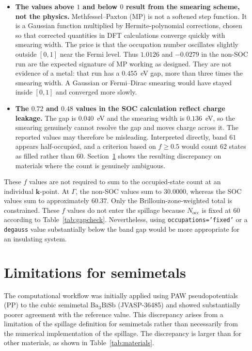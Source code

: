 \documentclass[11pt]{article}
\newcommand{\Nocc}{N_{\mathrm{occ}}}
\newcommand{\kk}{\mathbf{k}}
\newcommand{\bath}{\mathrm{Ba_3BiSb}}
\begin{document}
\begin{itemize}[leftmargin=1.4em,itemsep=2pt]
\item \textbf{The values above $1$ and below $0$ result from the smearing scheme, not the physics.}
Methfessel--Paxton (MP) is not a softened step function. It is a Gaussian function multiplied by
Hermite-polynomial corrections, chosen so that corrected quantities in DFT calculations converge
quickly with smearing width. The price is that the occupation number oscillates slightly outside
$[0,1]$ near the Fermi level. Thus
$1.0126$ and $-0.0279$ in the non-SOC run are the expected signature of MP working as designed. They
are not evidence of a metal: that run has a $0.455$~eV gap, more than three times the smearing width.
A Gaussian or Fermi--Dirac smearing would have stayed inside $[0,1]$ and converged more slowly.
\item \textbf{The $0.72$ and $0.48$ values in the SOC calculation reflect charge leakage.} The gap is $0.040$~eV and
the smearing width is $0.136$~eV, so the smearing genuinely cannot resolve the gap and moves charge
across it. The reported values may therefore be misleading. Interpreted directly, band $61$
appears half-occupied, and a criterion based on $f \ge 0.5$ would count $62$ states as filled rather
than $60$. Section~\ref{sec:semi} shows the resulting discrepancy on materials where the count is
genuinely ambiguous.
\end{itemize}

\noindent These $f$ values are not required to sum to the occupied-state count at an individual
$\kk$-point. At $\Gamma$, the non-SOC values sum to $30.0000$, whereas the SOC values sum to
approximately $60.37$. Only the Brillouin-zone-weighted total is constrained. These $f$ values do not enter the
spillage because $\Nocc$ is fixed at $60$ according to Table~\ref{tab:gapcheck}. Nevertheless, using
\texttt{occupations='fixed'} or a \texttt{degauss} value substantially below the band gap would be more
appropriate for an insulating system.

\section{Limitations for semimetals}\label{sec:semi}

The computational workflow was initially applied using PAW pseudopotentials (PP) to the cubic
semimetal $\bath$ (JVASP-36485) and showed
substantially poorer agreement with the reference value. This discrepancy arises from a limitation
of the spillage definition for semimetals rather than necessarily from the numerical implementation
of the spillage. The discrepancy is larger than for other materials, as shown in
Table~\ref{tab:materials}.
\end{document}
